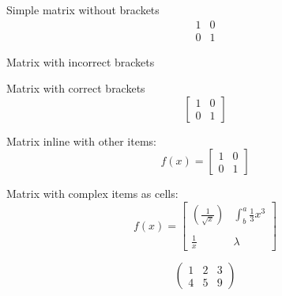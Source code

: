 \documentclass{article}
\begin{document}
Simple matrix without brackets
\begin{equation*}
\begin{matrix}
1 & 0\\
0 & 1
\end{matrix}
\end{equation*}

Matrix with incorrect brackets
\begin{equation*}
[
\begin{matrix}
1 & 0\\
0 & 1
\end{matrix}
]
\end{equation*}

Matrix with correct brackets
\begin{equation*}
\left[
\begin{matrix}
1 & 0\\
0 & 1
\end{matrix}
\right]
\end{equation*}

Matrix inline with other items:
\begin{equation*}
f(x) =
\left[
\begin{matrix}
1 & 0\\
0 & 1
\end{matrix}
\right]
\end{equation*}

Matrix with complex items as cells:
\begin{equation*}
f(x) =
\left[
\begin{matrix}
\left(\frac{1}{\sqrt{x}}\right) & \int^a_b \frac{1}{3}x^3\\\\
\frac{1}{x} & \lambda
\end{matrix}
\right]
\end{equation*}

\begin{equation*}
\begin{pmatrix}
   1 & 2 & 3\\
   4 & 5 & 9
\end{pmatrix}
\end{equation*}
\end{document}
